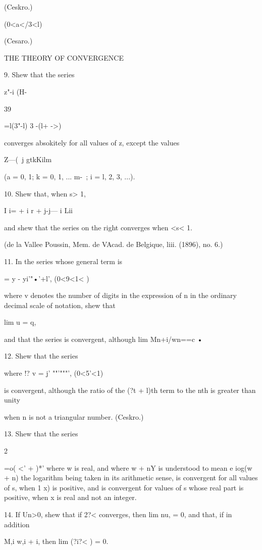 (Ceskro.)

(0<a</3<l)

(Cesaro.)



THE THEORY OF CONVERGENCE

9. Shew that the series

   z"-i (H-%



39



 =l(3"-l) 3 -(l+ ->)

converges absokitely for all values of z, except the values

Z—(\ j gtkKilm

(a = 0, 1; k = 0, 1, ... m-\ ; i = l, 2, 3, ...).

10. Shew that, when s> 1,

I i= + i r + j-j— i Lii

and shew that the series on the right converges when <s< 1.

(de la Vallee Poussin, Mem. de VAcad. de Belgique, liii. (1896), no.
6.)

11. In the series whose general term is

   = y - yi'"•'+l', (0<9<1< )

where v denotes the number of digits in the expression of n in the
ordinary decimal scale of notation, shew that

lim u = q,

and that the series is convergent, although lim Mn+i/wn==c •

12. Shew that the series

where !? v = j' ""'"""', (0<5'<1)

is convergent, although the ratio of the (?t + l)th term to the nth is
greater than unity

when n is not a triangular number. (Ceskro.)

13. Shew that the series

2

 =o( <' + )*' where w is real, and where w + nY is understood to mean
e iog(w + n) the logarithm being taken in its arithmetic sense, is
convergent for all values of s, when 1 x) is positive, and is
convergent for values of s whose real part is positive, when x is real
and not an integer.

14. If Un>0, shew that if 2?< converges, then lim nu, = 0, and that,
if in addition

M,i w,i + i, then lim (?i?< ) = 0.



